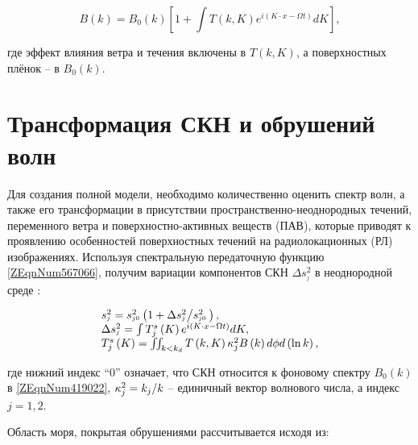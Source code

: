 \begin{equation} \label{1.43)} B\left(k\right)=B_{0} \left(k\right)\left[1+\int T(k,K)e^{i\left(K\cdot x-\Omega t\right)} dK \right],  \end{equation} 



\noindent где эффект влияния ветра и течения включены в $T(k,K)$, а поверхностных плёнок -- в $B_{0} \left(k\right)$.



\section{Трансформация СКН и обрушений волн} \label{AppendixA2}

Для создания полной модели, необходимо количественно оценить спектр волн, а также его трансформации в присутствии пространственно-неоднородных течений, переменного ветра и поверхностно-активных веществ (ПАВ), которые приводят к проявлению особенностей поверхностных течений на радиолокационных (РЛ) изображениях. Используя спектральную передаточную функцию \eqref{ZEqnNum567066}, получим вариации компонентов СКН $\Delta s_{^{j} }^{2} $ в неоднородной среде \citep{Kudryavtsev2005}:



\begin{equation} \label{1.44)} \begin{array}{l} {s_{^{j} }^{2} =s_{^{j0} }^{2} \left(1+{\Delta s_{^{j} }^{2} \mathord{\left/ {\vphantom {\Delta s_{^{j} }^{2}  s_{^{j0} }^{2} \, }} \right. \kern-\nulldelimiterspace} s_{^{j0} }^{2} \, } \right),} \\ {\Delta s_{^{j} }^{2} =\int T_{j}^{s} \left(K\right)e^{i\left(K\cdot x-\Omega t\right)}  dK,} \\ {T_{j}^{s} \left(K\right)=\iint \nolimits _{k<k_{d} }T\left(k,K\right)\kappa _{j}^{2} B\left(k\right) d\phi d\left(\ln k\right),} \end{array} \end{equation} 



\noindent где нижний индекс ``0'' означает, что СКН относится к фоновому спектру $B_{0} \left(k\right)$ в \eqref{ZEqnNum419022}, $\kappa _{j}^{2} ={k_{j} \mathord{\left/ {\vphantom {k_{j}  k}} \right. \kern-\nulldelimiterspace} k} $ -- единичный вектор волнового числа, а индекс $j=1,2$.

Область моря, покрытая обрушениями рассчитывается исходя из:



